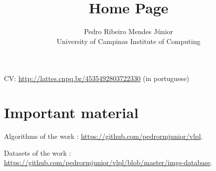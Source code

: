 \documentclass{article}
\title{Home Page}
\author{Pedro Ribeiro Mendes J\'{u}nior\\University of Campinas \textemdash{} Institute of Computing}
\begin{document}
\maketitle

CV: \url{http://lattes.cnpq.br/4535492803722330} (in portuguese)


\section{Important material}
\label{sec:important-material}

Algorithms of the work \cite{MendesJr2011}: \url{https://github.com/pedrormjunior/vlpl}.

Datasets of the work \cite{MendesJr2011}: \url{https://github.com/pedrormjunior/vlpl/blob/master/imgs-database}.



\end{document}
